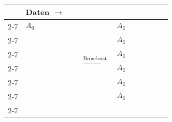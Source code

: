 \begin{figure}[tbp]%
      \begin{subfigure}[l]{0.87\textwidth}
	\begin{tabular}[]{m{0.2cm} m{0.3cm}|m{0.3cm}|m{0.3cm}|m{0.3cm}|m{0.3cm}|m{0.3cm} m{1.5cm} m{0.3cm}|m{0.3cm}|m{0.3cm}|m{0.3cm}|m{0.3cm}|m{0.3cm}}
	  & \multicolumn{13}{l}{Daten $\longrightarrow$}\\
	  \cline{2-7} \cline{9-14}
	  \multirow{6}{*}{\begin{turn}{-90} Prozesse $\longrightarrow$ \end{turn}}
	  &\multicolumn{1}{|c|}{$A_0$}& & & & &\multicolumn{1}{|m{0.3cm}|}{ } &\multirow{6}{*}{\large $\xrightarrow{\text{Broadcast}}$} & \multicolumn{1}{|c|}{$A_0$}& & & & &\multicolumn{1}{|m{0.3cm}|}{ }\\
	  \cline{2-7} \cline{9-14}
	  &\multicolumn{1}{|c|}{ }& & & & &\multicolumn{1}{|c|}{ }                         & & \multicolumn{1}{|c|}{$A_0$}    & & & & &                \multicolumn{1}{|c|}{ }    \\
	  \cline{2-7} \cline{9-14}
	  &\multicolumn{1}{|c|}{ }& & & & &\multicolumn{1}{|c|}{ }                         & & \multicolumn{1}{|c|}{$A_0$}    & & & & &                \multicolumn{1}{|c|}{ }    \\
	  \cline{2-7} \cline{9-14}
	  &\multicolumn{1}{|c|}{ }& & & & &\multicolumn{1}{|c|}{ }                         & & \multicolumn{1}{|c|}{$A_0$}    & & & & &                \multicolumn{1}{|c|}{ }    \\
	  \cline{2-7} \cline{9-14}
	  &\multicolumn{1}{|c|}{ }& & & & &\multicolumn{1}{|c|}{ }                         & & \multicolumn{1}{|c|}{$A_0$}    & & & & &                \multicolumn{1}{|c|}{ }    \\
	  \cline{2-7} \cline{9-14}
	  &\multicolumn{1}{|c|}{ }& & & & &\multicolumn{1}{|c|}{ }                         & & \multicolumn{1}{|c|}{$A_0$}    & & & & &                \multicolumn{1}{|c|}{ }    \\
	  \cline{2-7} \cline{9-14}
	\end{tabular}
      \end{subfigure}
      

\end{figure}
